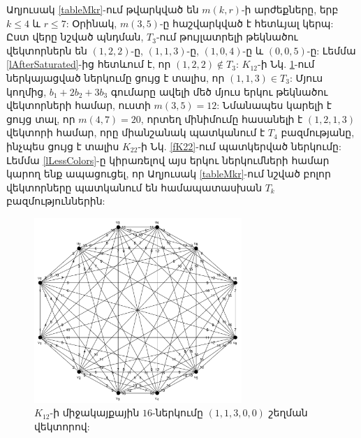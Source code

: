 Աղյուսակ \ref{tableMkr}-ում թվարկված են $m(k,r)$-ի արժեքները, երբ $k\leq 4$ և $r \leq 7$: Օրինակ, $m(3,5)$-ը հաշվարկված է հետևյալ կերպ: Ըստ վերը նշված պնդման, $T_3$-ում թույլատրելի թեկնածու վեկտորներն են $(1,2,2)$-ը, $(1,1,3)$-ը, $(1,0,4)$-ը և $(0,0,5)$-ը: Լեմմա \ref{lAfterSaturated}-ից հետևում է, որ $(1,2,2) \notin T_3$: $K_{12}$-ի Նկ. \ref{fK12}-ում ներկայացված ներկումը ցույց է տալիս, որ $(1,1,3) \in T_3$: Մյուս կողմից, $b_1 + 2b_2 + 3b_3$ գումարը ավելի մեծ մյուս երկու թեկնածու վեկտորների համար, ուստի $m(3,5) = 12$: Նմանապես կարելի է ցույց տալ, որ $m(4,7)=20$, որտեղ մինիմումը հասանելի է $(1,2,1,3)$ վեկտորի համար, որը միանշանակ պատկանում է $T_4$ բազմությանը, ինչպես ցույց է տալիս $K_{22}$-ի Նկ. \ref{fK22}-ում պատկերված ներկումը: Լեմմա \ref{lLessColors}-ը կիրառելով այս երկու ներկումների համար կարող ենք ապացուցել, որ Աղյուսակ \ref{tableMkr}-ում նշված բոլոր վեկտորները պատկանում են համապատասխան $T_k$ բազմություններին:


\begin{figure}
\centering
\includegraphics[width=0.7\textwidth]{figures/K_12-16.pdf}
\caption{$K_{12}$-ի միջակայքային $16$-ներկումը $(1,1,3,0,0)$ շեղման վեկտորով:}
\label{fK12}
\end{figure}



